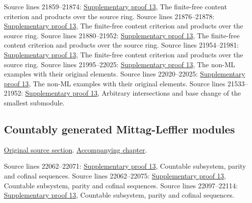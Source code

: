 \begin{AlgebraSourceRoutes}
 Source lines 21859--21874: \hyperlink{algebra_ml_coherent_notes_20260927}{Supplementary proof 13}, The finite-free content criterion and products over the source ring.
 Source lines 21876--21878: \hyperlink{algebra_ml_coherent_notes_20260927}{Supplementary proof 13}, The finite-free content criterion and products over the source ring.
 Source lines 21880--21952: \hyperlink{algebra_ml_coherent_notes_20260927}{Supplementary proof 13}, The finite-free content criterion and products over the source ring.
 Source lines 21954--21981: \hyperlink{algebra_ml_coherent_notes_20260927}{Supplementary proof 13}, The finite-free content criterion and products over the source ring.
 Source lines 21995--22025: \hyperlink{algebra_ml_coherent_notes_20260927}{Supplementary proof 13}, The non-ML examples with their original elements.
 Source lines 22020--22025: \hyperlink{algebra_ml_coherent_notes_20260927}{Supplementary proof 13}, The non-ML examples with their original elements.
 Source lines 21533--21952: \hyperlink{algebra_ml_coherent_notes_20260927}{Supplementary proof 13}, Arbitrary intersections and base change of the smallest submodule.
\end{AlgebraSourceRoutes}

\subsection{Countably generated Mittag-Leffler modules}
\hypertarget{algebra-source-section-ML-countable}{}
\noindent\href{https://github.com/stacks/stacks-project/blob/a04446e57ec1fbc252a871afcec7752fb2807b14/algebra.tex\#L22045}{Original source section}. \href{algebra.pdf\#nameddest=section-ML-countable}{Accompanying chapter}.

\begin{AlgebraSourceRoutes}
 Source lines 22062--22071: \hyperlink{algebra_ml_coherent_notes_20260927}{Supplementary proof 13}, Countable subsystem, parity and cofinal sequences.
 Source lines 22062--22075: \hyperlink{algebra_ml_coherent_notes_20260927}{Supplementary proof 13}, Countable subsystem, parity and cofinal sequences.
 Source lines 22097--22114: \hyperlink{algebra_ml_coherent_notes_20260927}{Supplementary proof 13}, Countable subsystem, parity and cofinal sequences.
\end{AlgebraSourceRoutes}

